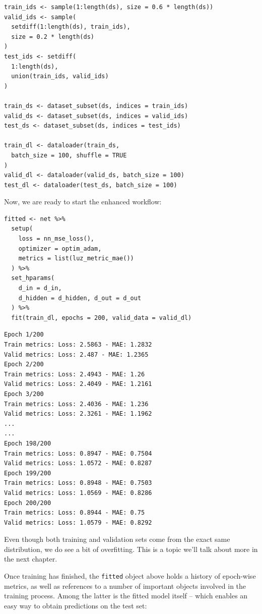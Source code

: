 \documentclass[
  letterpaper,
]{krantz}
\begin{document}
\begin{verbatim}
train_ids <- sample(1:length(ds), size = 0.6 * length(ds))
valid_ids <- sample(
  setdiff(1:length(ds), train_ids),
  size = 0.2 * length(ds)
)
test_ids <- setdiff(
  1:length(ds),
  union(train_ids, valid_ids)
)

train_ds <- dataset_subset(ds, indices = train_ids)
valid_ds <- dataset_subset(ds, indices = valid_ids)
test_ds <- dataset_subset(ds, indices = test_ids)

train_dl <- dataloader(train_ds,
  batch_size = 100, shuffle = TRUE
)
valid_dl <- dataloader(valid_ds, batch_size = 100)
test_dl <- dataloader(test_ds, batch_size = 100)
\end{verbatim}

Now, we are ready to start the enhanced workflow:

\begin{verbatim}
fitted <- net %>%
  setup(
    loss = nn_mse_loss(),
    optimizer = optim_adam,
    metrics = list(luz_metric_mae())
  ) %>%
  set_hparams(
    d_in = d_in,
    d_hidden = d_hidden, d_out = d_out
  ) %>%
  fit(train_dl, epochs = 200, valid_data = valid_dl)
\end{verbatim}

\begin{verbatim}
Epoch 1/200
Train metrics: Loss: 2.5863 - MAE: 1.2832                                       
Valid metrics: Loss: 2.487 - MAE: 1.2365
Epoch 2/200
Train metrics: Loss: 2.4943 - MAE: 1.26                                          
Valid metrics: Loss: 2.4049 - MAE: 1.2161
Epoch 3/200
Train metrics: Loss: 2.4036 - MAE: 1.236                                         
Valid metrics: Loss: 2.3261 - MAE: 1.1962
...
...
Epoch 198/200
Train metrics: Loss: 0.8947 - MAE: 0.7504
Valid metrics: Loss: 1.0572 - MAE: 0.8287
Epoch 199/200
Train metrics: Loss: 0.8948 - MAE: 0.7503
Valid metrics: Loss: 1.0569 - MAE: 0.8286
Epoch 200/200
Train metrics: Loss: 0.8944 - MAE: 0.75
Valid metrics: Loss: 1.0579 - MAE: 0.8292
\end{verbatim}

Even though both training and validation sets come from the exact same
distribution, we do see a bit of overfitting. This is a topic we'll talk
about more in the next chapter.

Once training has finished, the \texttt{fitted} object above holds a
history of epoch-wise metrics, as well as references to a number of
important objects involved in the training process. Among the latter is
the fitted model itself -- which enables an easy way to obtain
predictions on the test set:
\end{document}
